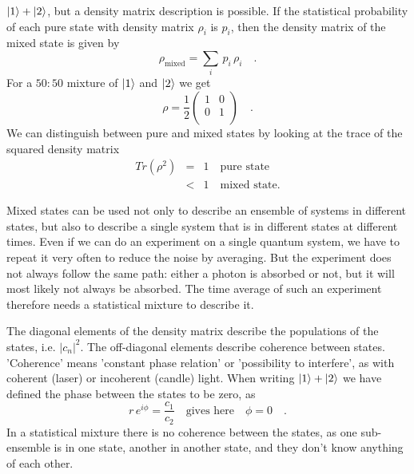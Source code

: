 $\ket{1} + \ket{2} $, but a density matrix description is possible. If the statistical probability of each pure state with density matrix $\rho_i$ is $p_i$, then the density matrix of the mixed state is given by
\begin{equation}
\rho_\text{mixed} = \sum_i \, p_i \, \rho_i \quad .
\end{equation}
For a $50:50$ mixture of $\ket{1}$ and  $\ket{2}$ we get
\begin{equation}
 \rho = \frac{1}{2} \begin{pmatrix}
 1 & 0 \\ 0 & 1 \\
 \end{pmatrix} \quad .
\end{equation}
We can distinguish between pure and mixed states by looking at the trace of the squared density matrix
\begin{eqnarray}
 Tr (\rho^2) & = & 1 \quad \text{pure state} \\
 				& < & 1 \quad \text{mixed state.}
\end{eqnarray}

Mixed states can be used not only to describe an ensemble of systems in different states, but also to describe a single system that is in different states at different times. Even if we can do an experiment on a single quantum system, we have to repeat it very often to reduce the noise by averaging. But the experiment does not always follow the same path: either a photon is absorbed or not, but it will most likely not always be absorbed. The time average of such an experiment therefore needs a statistical mixture to describe it.

The diagonal elements of the density matrix describe the populations of the states, i.e. $|c_n|^2$. The off-diagonal elements describe coherence between states. 'Coherence' means 'constant phase relation' or 'possibility to interfere', as with coherent (laser) or incoherent (candle) light. When writing $\ket{1} + \ket{2} $ we have defined the phase between the states to be zero, as  
\begin{equation}
r \, e^{i \phi} = \frac{c_1}{c_2} \quad \text{gives here} \quad \phi = 0 \quad .
\end{equation}
In a statistical mixture there is no coherence between the states, as one sub-ensemble is in one state, another in another state, and they don't know anything of each other.




